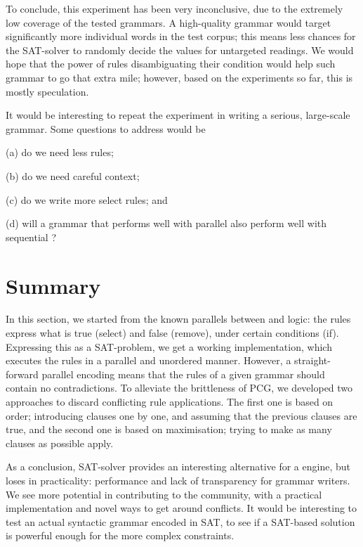 To conclude, this experiment has been very inconclusive, due to the extremely low coverage 
of the tested grammars.
A high-quality grammar would target significantly more individual words in the test corpus;
this means less chances for the SAT-solver to randomly decide the values for untargeted readings. We would hope that the power of rules disambiguating their condition would help 
such grammar to go that extra mile; however, based on the experiments so far, this is mostly speculation.



It would be interesting to repeat the experiment in writing a serious, large-scale grammar.
Some questions to address would be 
\begin{inparaenum}
\item[(a)] do we need less rules;
\item[(b)] do we need careful context;
\item[(c)] do we write more {\sc select} rules; and
\item[(d)] will a grammar that performs well with parallel \onlycg{} also perform well with sequential \onlycg{}?
\end{inparaenum}

\section{Summary}

In this section, we started from the known parallels between \onlycg{} and logic:
the rules express what is true ({\sc select}) and false ({\sc remove}), under certain conditions ({\sc if}).
Expressing this as a SAT-problem, we get a working \onlycg{} implementation, which executes the rules in a parallel and unordered manner. 
However, a straight-forward parallel encoding means that the rules of a given grammar should contain no contradictions.  
To alleviate the brittleness of PCG, we developed two approaches to discard conflicting rule applications.
The first one is based on order; introducing clauses one by one, and assuming that the previous clauses are true, 
and the second one is based on maximisation; trying to make as many clauses as possible apply.


As a conclusion, SAT-solver provides an interesting alternative for a \onlycg{} engine, but loses in practicality: performance and lack of transparency for grammar writers.
We see more potential in contributing to the \fsig{} community, with a practical implementation and 
novel ways to get around conflicts. It would be interesting to test an actual syntactic \fsig{} grammar encoded in SAT, to see if a SAT-based solution is powerful enough for the more complex constraints.


